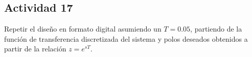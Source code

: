 \newpage
\subsection{Actividad 17}
Repetir el diseño en formato digital asumiendo un $T=0.05$,
partiendo de la función de transferencia discretizada del sistema y
polos deseados obtenidos a partir de la relación $z=e^{sT}$.



\begin{tcolorbox}[sharp corners, colframe=bluebox, title= Respuesta
  del sistema en tiempo discreto]
  \vspace*{0.35em}
\vspace*{0.35em}
  \end{tcolorbox}%
